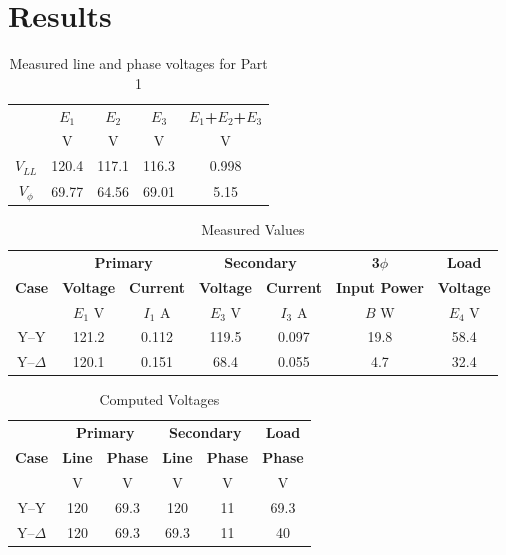 \documentclass{article}
\begin{document}
\section{Results}

\begin{table}[H]
  \centering
  \begin{tabular}{*{5}{c}}
    & \textbf{$E_1$} & \textbf{$E_2$} & \textbf{$E_3$} & \textbf{$E_1$+$E_2$+$E_3$} \\
    & V & V & V & V \\

    \hline

    \textbf{$V_{LL}$} & 120.4 & 117.1 & 116.3 & 0.998 \\
    \textbf{$V_{\phi}$} & 69.77 & 64.56 & 69.01 & 5.15 \\
  \end{tabular}
  \caption{Measured line and phase voltages for Part 1}
  \label{tab:3phase_source}
\end{table}

\begin{table}[H]
  \centering
  \begin{tabular}{*{7}{c}}
    & \multicolumn{2}{c}{\textbf{Primary}} &
    \multicolumn{2}{c}{\textbf{Secondary}} & \textbf{3$\phi$} & \textbf{Load} \\

    \textbf{Case} & \textbf{Voltage} & \textbf{Current} & \textbf{Voltage} &
    \textbf{Current} & \textbf{Input Power} & \textbf{Voltage} \\

    & $E_1$ V & $I_1$ A & $E_3$ V & $I_3$ A & $B$ W & $E_4$ V \\

    \hline
    Y--Y        & 121.2 & 0.112 & 119.5 & 0.097 & 19.8 & 58.4 \\
    Y--$\Delta$ & 120.1 & 0.151 & 68.4 & 0.055 & 4.7 & 32.4 \\
  \end{tabular}
  \caption{Measured Values}
  \label{tab:results}
\end{table}

\begin{table}[H]
  \centering
  \begin{tabular}{*{6}{c}}

    & \multicolumn{2}{c}{\textbf{Primary}} &
    \multicolumn{2}{c}{\textbf{Secondary}} & \textbf{Load} \\

    \textbf{Case} & \textbf{Line} & \textbf{Phase} & \textbf{Line} &
    \textbf{Phase} & \textbf{Phase} \\

    & V & V & V & V & V \\
    \hline

    Y--Y        & 120 & 69.3 & 120 & 11 & 69.3 \\
    Y--$\Delta$ & 120 & 69.3 & 69.3 & 11 & 40 \\
  \end{tabular}
  \caption{Computed Voltages}
  \label{tab:volt_comp}
\end{table}
\end{document}
